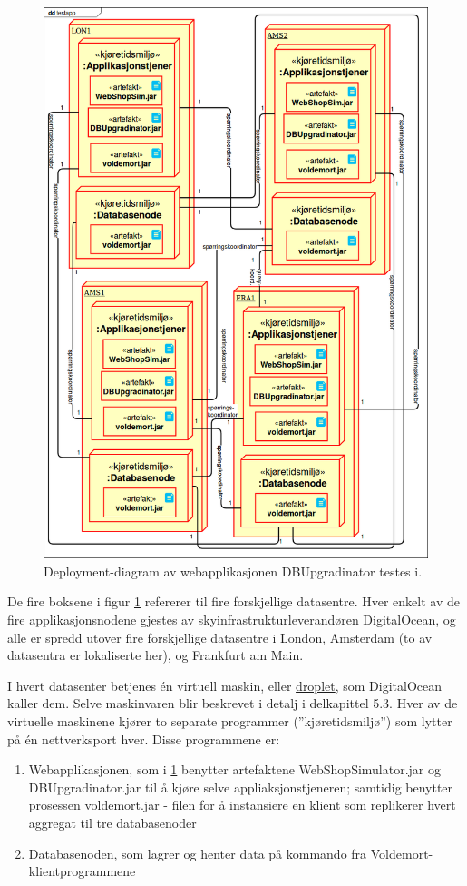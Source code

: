 \begin{figure}[hbtp]
  \centering
  \includegraphics[scale=0.5]{fig/dbupgradinator-physical.png}
  \caption{Deployment-diagram av webapplikasjonen DBUpgradinator testes i.}
  \label{fig10}
\end{figure}

De fire boksene i figur \ref{fig10} refererer til fire forskjellige datasentre. Hver enkelt av de fire applikasjonsnodene gjestes av skyinfrastrukturleverandøren DigitalOcean, og alle er spredd utover fire forskjellige datasentre i London, Amsterdam (to av datasentra er lokaliserte her), og Frankfurt am Main.

I hvert datasenter betjenes én virtuell maskin, eller \underline{droplet}, som DigitalOcean kaller dem. Selve maskinvaren blir beskrevet i detalj i delkapittel 5.3. Hver av de virtuelle maskinene kjører to separate programmer (''kjøretidsmiljø'') som lytter på én nettverksport hver. Disse programmene er:

\begin{enumerate}
  \item Webapplikasjonen, som i \ref{fig10} benytter artefaktene WebShopSimulator.jar og DBUpgradinator.jar til å kjøre selve appliaksjonstjeneren; samtidig benytter prosessen voldemort.jar - filen for å instansiere en klient som replikerer hvert aggregat til tre databasenoder
  \item Databasenoden, som lagrer og henter data på kommando fra Voldemort-klientprogrammene
\end{enumerate}

